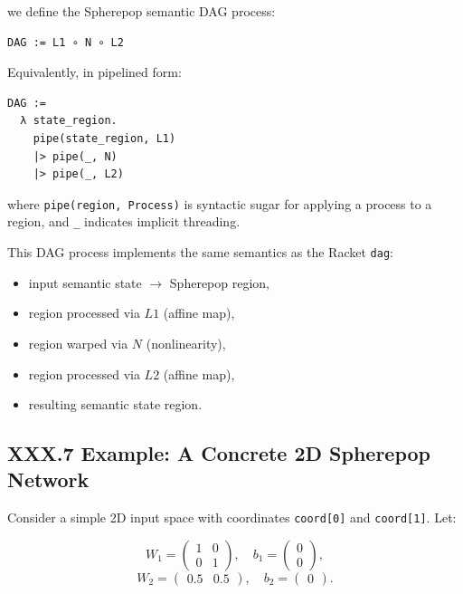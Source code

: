 \documentclass[11pt,letterpaper]{article}
\begin{document}
we define the Spherepop semantic DAG process:

\begin{verbatim}
DAG := L1 ∘ N ∘ L2
\end{verbatim}

Equivalently, in pipelined form:

\begin{verbatim}
DAG :=
  λ state_region.
    pipe(state_region, L1)
    |> pipe(_, N)
    |> pipe(_, L2)
\end{verbatim}

where \verb|pipe(region, Process)| is syntactic sugar for applying a process to a region, and \verb|_| indicates implicit threading.

This DAG process implements the same semantics as the Racket \verb|dag|:

\begin{itemize}
  \item input semantic state $\to$ Spherepop region,
  \item region processed via $L1$ (affine map),
  \item region warped via $N$ (nonlinearity),
  \item region processed via $L2$ (affine map),
  \item resulting semantic state region.
\end{itemize}

\subsection{XXX.7 Example: A Concrete 2D Spherepop Network}

Consider a simple 2D input space with coordinates \verb|coord[0]| and \verb|coord[1]|. Let:

\[
W_1 =
\begin{pmatrix}
1 & 0 \\
0 & 1
\end{pmatrix}, \quad
b_1 =
\begin{pmatrix}
0 \\ 0
\end{pmatrix},
\]
\[
W_2 =
\begin{pmatrix}
0.5 & 0.5
\end{pmatrix}, \quad
b_2 =
\begin{pmatrix}
0
\end{pmatrix}.
\]
\end{document}
